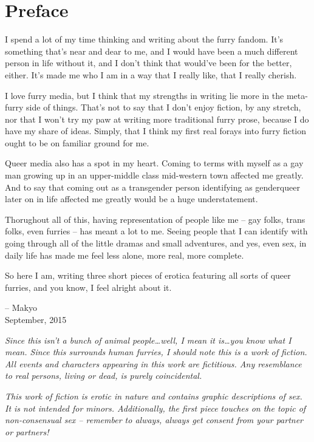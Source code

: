 \chapter*{Preface}

I spend a lot of my time thinking and writing about the furry fandom.  It's something that's near and dear to me, and I would have been a much different person in life without it, and I don't think that would've been for the better, either.  It's made me who I am in a way that I really like, that I really cherish.

I love furry media, but I think that my strengths in writing lie more in the meta-furry side of things.  That's not to say that I don't enjoy fiction, by any stretch, nor that I won't try my paw at writing more traditional furry prose, because I do have my share of ideas.  Simply, that I think my first real forays into furry fiction ought to be on familiar ground for me.

Queer media also has a spot in my heart.  Coming to terms with myself as a gay man growing up in an upper-middle class mid-western town affected me greatly. And to say that coming out as a transgender person identifying as genderqueer later on in life affected me greatly would be a huge understatement.

Thorughout all of this, having representation of people like me -- gay folks, trans folks, even furries -- has meant a lot to me.  Seeing people that I can identify with going through all of the little dramas and small adventures, and yes, even sex, in daily life has made me feel less alone, more real, more complete.

So here I am, writing three short pieces of erotica featuring all sorts of queer furries, and you know, I feel alright about it.

-- Makyo\\September, 2015

\newpage
\textit{Since this isn't a bunch of animal people\ldots{}well, I mean it is\ldots{}you know what I mean.  Since this surrounds human furries, I should note this is a work of fiction. All events and characters appearing in this work are fictitious. Any resemblance to real persons, living or dead, is purely coincidental.}

\textit{This work of fiction is erotic in nature and contains graphic descriptions of sex.  It is not intended for minors.  Additionally, the first piece touches on the topic of non-consensual sex -- remember to always, always get consent from your partner or partners!}
